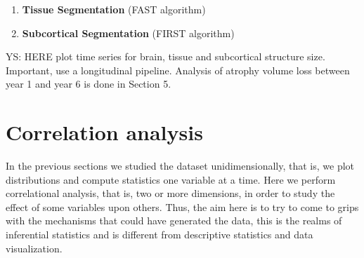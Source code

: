 \documentclass[11pt]{article}
\theoremstyle{definition}
\theoremstyle{remark}
\begin{document}
\begin{enumerate}
  \item \textbf{Tissue Segmentation} (FAST algorithm)
  \item \textbf{Subcortical Segmentation} (FIRST algorithm)
\end{enumerate}

YS: HERE plot time series for brain, tissue and subcortical structure size. Important, use a longitudinal pipeline. 
Analysis of atrophy volume loss between year 1 and year 6 is done in Section 5.


\section{Correlation analysis}
\label{se:met}

In the previous sections we studied the dataset unidimensionally, that is, we plot distributions and compute statistics one variable at a time. Here we perform correlational analysis, that is, two or more dimensions, in order to study the effect of some variables upon others. Thus, the aim here is to try to come to grips with the mechanisms that could have generated the data, this is the realms of inferential statistics and is different from descriptive statistics and data visualization. 
\end{document}
